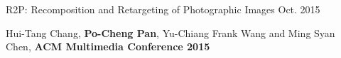 


\begin{cventries}


\cventrytwo
{R2P: Recomposition and Retargeting of Photographic Images} %
{Oct. 2015}
{ %
\begin{cvitems}
\item{Hui-Tang Chang, \textbf{Po-Cheng Pan}, Yu-Chiang Frank Wang and Ming Syan Chen, \textbf {ACM Multimedia Conference 2015}}
\end{cvitems}
}

\end{cventries}